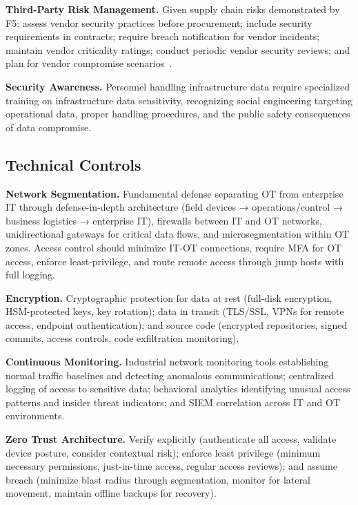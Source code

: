 \documentclass[sigconf,nonacm]{acmart}
\begin{document}
\textbf{Third-Party Risk Management.} Given supply chain risks demonstrated by F5:
assess vendor security practices before procurement; include security requirements in
contracts; require breach notification for vendor incidents; maintain vendor criticality
ratings; conduct periodic vendor security reviews; and plan for vendor compromise
scenarios~\cite{boyens2024supply}.

\textbf{Security Awareness.} Personnel handling infrastructure data require specialized
training on infrastructure data sensitivity, recognizing social engineering targeting
operational data, proper handling procedures, and the public safety consequences of data
compromise.

\subsection{Technical Controls}

\textbf{Network Segmentation.} Fundamental defense separating OT from enterprise IT
through defense-in-depth architecture (field devices → operations/control → business
logistics → enterprise IT), firewalls between IT and OT networks, unidirectional
gateways for critical data flows, and microsegmentation within OT zones. Access control
should minimize IT-OT connections, require MFA for OT access, enforce least-privilege,
and route remote access through jump hosts with full logging.

\textbf{Encryption.} Cryptographic protection for data at rest (full-disk encryption,
HSM-protected keys, key rotation); data in transit (TLS/SSL, VPNs for remote access,
endpoint authentication); and source code (encrypted repositories, signed commits,
access controls, code exfiltration monitoring).

\textbf{Continuous Monitoring.} Industrial network monitoring tools establishing normal
traffic baselines and detecting anomalous communications; centralized logging of access
to sensitive data; behavioral analytics identifying unusual access patterns and insider
threat indicators; and SIEM correlation across IT and OT environments.

\textbf{Zero Trust Architecture.} Verify explicitly (authenticate all access, validate
device posture, consider contextual risk); enforce least privilege (minimum necessary
permissions, just-in-time access, regular access reviews); and assume breach (minimize
blast radius through segmentation, monitor for lateral movement, maintain offline backups
for recovery).
\end{document}
